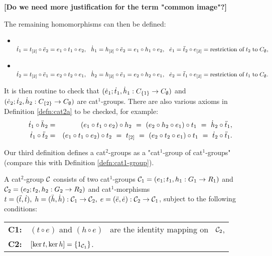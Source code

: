 \noindent
{\bf [Do we need more justification for the term "common image"?]}

\medskip\noindent
The remaining homomorphisms can then be defined: 
\begin{itemize}
\item~ 
$
\dot{t}_1 = t_{[2]} \circ \ddot{e}_2 = e_1 \circ t_1 \circ e_2,~~ 
\dot{h}_1 = h_{[2]} \circ \ddot{e}_2 = e_1 \circ h_1 \circ e_2,~~ 
\dot{e}_1 = \ddot{t}_2 \circ e_{[2]} 
      = \mbox{restriction of}\; t_2\; \mbox{to}\; C_{\emptyset}, 
$
\item~ 
$
\dot{t}_2 = t_{[2]} \circ \ddot{e}_1 = e_2 \circ t_2 \circ e_1,~~ 
\dot{h}_2 = h_{[2]} \circ \ddot{e}_1 = e_2 \circ h_2 \circ e_1,~~ 
\dot{e}_2 = \ddot{t}_1 \circ e_{[2]} 
      = \mbox{restriction of}\; t_1\; \mbox{to}\; C_{\emptyset}. 
$
\end{itemize} 
It is then routine to check that 
$(\dot{e}_1;\dot{t}_1,\dot{h}_1 : C_{\{1\}} \to C_{\emptyset})$
and
$(\dot{e}_2;\dot{t}_2,\dot{h}_2 : C_{\{2\}} \to C_{\emptyset})$
are cat$^1$-groups. 
There are also various axioms in Definition \ref{defn:cat2a} to be checked, 
for example: 
\begin{eqnarray*}
\dot{t}_1\circ\ddot{h}_2 &=& 
  (e_1 \circ t_1 \circ e_2) \circ h_2 
~=~ (e_2 \circ h_2 \circ e_1) \circ t_1 
~=~ \dot{h}_2\circ\ddot{t}_1, \\
\dot{t}_1\circ\ddot{t}_2 &=& 
  (e_1 \circ t_1 \circ e_2) \circ t_2 
~=~ t_{[2]} 
~=~ (e_2 \circ t_2 \circ e_1) \circ t_1 
~=~ \dot{t}_2\circ\ddot{t}_1. \\
\end{eqnarray*}

Our third definition defines a cat$^2$-groups as a 
"cat$^1$-group of cat$^1$-groups" 
(compare this with Definition \ref{defn:cat1-group}). 

\begin{defn} \label{defn:cat2c} 
A cat$^2$-group $\mathcal{C}$ consists of two cat$^1$-groups 
$\mathcal{C}_1 = (e_1;t_1,h_1 : G_1 \to R_1)$ and 
$\mathcal{C}_2 = (e_2;t_2,h_2 : G_2 \to R_2)$ and cat$^1$-morphisms
$t = (\ddot{t},\dot{t}),\; h = (\ddot{h},\dot{h}) : \mathcal{C}_1 \to \mathcal{C}_2,\; 
e = (\ddot{e},\dot{e}) : \mathcal{C}_2 \to \mathcal{C}_1$,  
subject to the following conditions: 
\begin{center}
\begin{tabular}{r l}
\textbf{C1:}  &  $(t \circ e)$ and $(h \circ e)$~ 
                 are the identity mapping on~ $\mathcal{C}_2$, \\
\textbf{C2:}  &  $[\ker t, \ker h] = \{ 1_{\mathcal{C}_1} \}$.
\end{tabular}
\end{center}
\end{defn}

